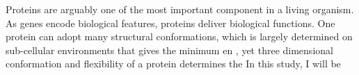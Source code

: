 Proteins are arguably one of the most important component in a living organism. As genes encode biological features, proteins deliver biological functions. One protein can adopt many structural conformations, which is largely determined on sub-cellular environments that gives the minimum en , yet three dimensional conformation and flexibility of a protein determines the     In this study, I will be 
